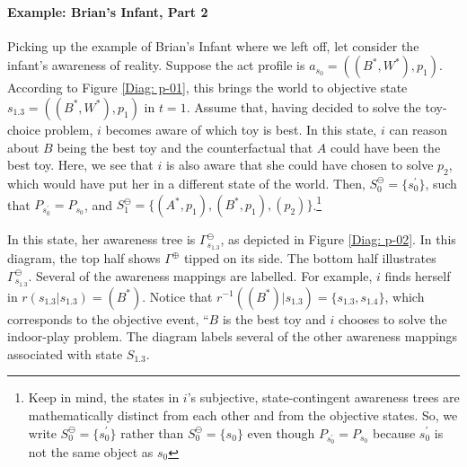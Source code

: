 \documentclass[
11pt,
titlepage,
reqno,
]{article}%
\theoremstyle{definition}
\begin{document}
%	
	
\paragraph{Example: Brian's Infant, Part 2}	
Picking up the example of Brian's Infant where we left off, let consider the infant's awareness of reality.
Suppose the act profile is $a_{s_0}=((B^\ast,W^\ast),p_1)$.
According to Figure \ref{Diag: p-01}, this brings the world to objective state $s_{1.3}=((B^\ast,W^\ast),p_1)$ in  $t=1$.
Assume that, having decided to solve the toy-choice problem, $i$ becomes aware of which toy is best.
In this state, $i$ can reason about $B$ being the best toy and the counterfactual that $A$ could have been the best toy.
Here, we see that $i$ is also aware that she could have chosen to solve $p_2$, which would have put her in a different state of the world. 
Then, $S^\ominus_0=\{s^\prime_0\}$, such that $P_{s^\prime_0}=P_{s_0}$, and  $S^\ominus_1=\{(A^\ast,p_1),(B^\ast,p_1),(p_2)\}$.\footnote
{
	Keep in mind, the states in $i$'s subjective, state-contingent awareness trees are mathematically distinct from each other and from the objective states. So, we write  $S^\ominus_0=\{s^\prime_0\}$ rather than $S^\ominus_0=\{s_0\}$ even though $P_{s^\prime_0}=P_{s_0}$ because $s^\prime_0$ is not the same object as $s_0$
}

In this state, her awareness tree is $\Gamma^\ominus_{s_{1.3}}$, as depicted in Figure \ref{Diag: p-02}.
In this diagram, the top half shows $\Gamma^\oplus$ tipped on its side. 
The bottom half illustrates $\Gamma^\ominus_{s_{1.3}}$.
Several of the awareness mappings are labelled.
For example, $i$ finds herself in $r(s_{1.3}|s_{1.3})=(B^\ast)$.
Notice that $r^{-1}((B^\ast)|s_{1.3})=\{s_{1.3},s_{1.4}\}$, which corresponds to the objective event, ``$B$ is the best toy and $i$ chooses to solve the indoor-play problem.
The diagram labels several of the other awareness mappings associated with state $S_{1.3}$.
\end{document}
